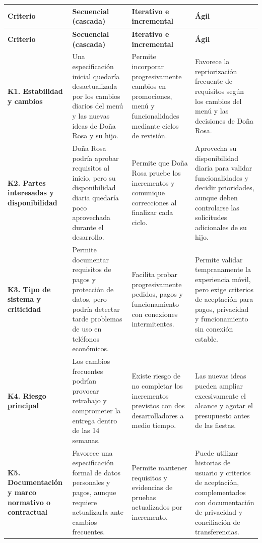 \documentclass[12pt,a4paper]{article}
\begin{document}
\begin{longtable}{|>{\raggedright\arraybackslash}p{}|>{\raggedright\arraybackslash}p{}|>{\raggedright\arraybackslash}p{}|>{\raggedright\arraybackslash}p{}|}
\hline
\textbf{Criterio} &
\textbf{Secuencial (cascada)} &
\textbf{Iterativo e incremental} &
\textbf{Ágil} \\
\hline
\endfirsthead

\hline
\textbf{Criterio} &
\textbf{Secuencial (cascada)} &
\textbf{Iterativo e incremental} &
\textbf{Ágil} \\
\hline
\endhead

\textbf{K1. Estabilidad y cambios} &
Una especificación inicial quedaría desactualizada
por los cambios diarios del menú y las nuevas ideas
de Doña Rosa y su hijo. &
Permite incorporar progresivamente cambios en
promociones, menú y funcionalidades mediante
ciclos de revisión. &
Favorece la repriorización frecuente de requisitos
según los cambios del menú y las decisiones
de Doña Rosa. \\
\hline

\textbf{K2. Partes interesadas y disponibilidad} &
Doña Rosa podría aprobar requisitos al inicio,
pero su disponibilidad diaria quedaría poco
aprovechada durante el desarrollo. &
Permite que Doña Rosa pruebe los incrementos
y comunique correcciones al finalizar cada ciclo. &
Aprovecha su disponibilidad diaria para validar
funcionalidades y decidir prioridades, aunque
deben controlarse las solicitudes adicionales
de su hijo. \\
\hline

\textbf{K3. Tipo de sistema y criticidad} &
Permite documentar requisitos de pagos y protección
de datos, pero podría detectar tarde problemas
de uso en teléfonos económicos. &
Facilita probar progresivamente pedidos, pagos
y funcionamiento con conexiones intermitentes. &
Permite validar tempranamente la experiencia móvil,
pero exige criterios de aceptación para pagos,
privacidad y funcionamiento sin conexión estable. \\
\hline

\textbf{K4. Riesgo principal} &
Los cambios frecuentes podrían provocar retrabajo
y comprometer la entrega dentro de las 14 semanas. &
Existe riesgo de no completar los incrementos
previstos con dos desarrolladores a medio tiempo. &
Las nuevas ideas pueden ampliar excesivamente
el alcance y agotar el presupuesto antes
de las fiestas. \\
\hline

\textbf{K5. Documentación y marco normativo o contractual} &
Favorece una especificación formal de datos
personales y pagos, aunque requiere actualizarla
ante cambios frecuentes. &
Permite mantener requisitos y evidencias
de pruebas actualizados por incremento. &
Puede utilizar historias de usuario y criterios
de aceptación, complementados con documentación
de privacidad y conciliación de transferencias. \\
\hline

\end{longtable}
\endgroup
\end{document}
